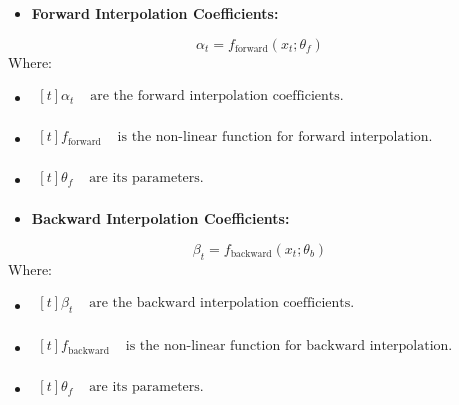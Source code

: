 \documentclass{ieeeojies}
\begin{document}
\begin{itemize}
    \item  \textbf{Forward Interpolation Coefficients:} 
\end{itemize}
\begin{equation}
\alpha_t = f_{\text{forward}}(x_t; \theta_f)
\end{equation}
Where: 
\begin{itemize}
    \item $\begin{aligned}[t]
            \alpha_t & \text{ are the forward interpolation coefficients.} \\
            \end{aligned}$
    \item $\begin{aligned}[t]
            f_{\text{forward}} & \text{ is the non-linear function for forward interpolation.} \\
            \end{aligned}$
    \item $\begin{aligned}[t]
            \theta_f & \text{ are its parameters.} \\
            \end{aligned}$
\end{itemize}

\begin{itemize}
    \item  \textbf{Backward Interpolation Coefficients:} 
\end{itemize}
\begin{equation}
\beta_t = f_{\text{backward}}(x_t; \theta_b)
\end{equation}
Where: 
\begin{itemize}
    \item $\begin{aligned}[t]
            \beta_t & \text{ are the backward interpolation coefficients.} \\
            \end{aligned}$
    \item $\begin{aligned}[t]
            f_{\text{backward}} & \text{ is the non-linear function for backward interpolation.} \\
            \end{aligned}$
    \item $\begin{aligned}[t]
            \theta_f & \text{ are its parameters.} \\
            \end{aligned}$
\end{itemize}
\end{document}
